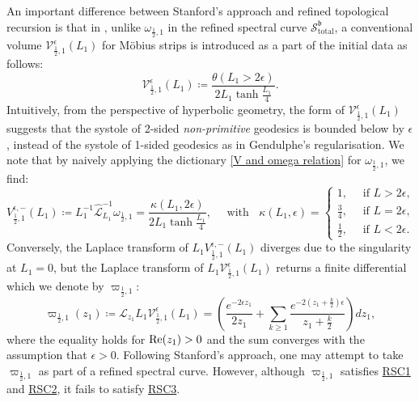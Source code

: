 \documentclass[12pt]{amsart}
\theoremstyle{plain}
\theoremstyle{definition}
\theoremstyle{remark}
\numberwithin{equation}{section}
\begin{document}
An important difference between Stanford's approach and refined topological recursion is that in \cite{Sta23}, unlike $\omega_{\frac12,1}$ in the refined spectral curve $\mathcal{S}^\mathfrak{b}_{\text{total}}$, a conventional volume $\mathcal{V}_{\frac12,1}^{\epsilon}(L_1)$ for M\"{o}bius strips is introduced as a part of the initial data as follows:
\[\mathcal{V}_{\frac12,1}^{\epsilon}(L_1)\coloneqq\frac{\theta(L_1>2\epsilon)}{2L_1\tanh\frac{L_1}{4}}.\]
Intuitively, from the perspective of hyperbolic geometry, the form of $\mathcal{V}_{\frac12,1}^{\epsilon}(L_1)$ suggests that the systole of 2-sided \emph{non-primitive} geodesics is bounded below by $\epsilon$, instead of the systole of 1-sided geodesics as in Gendulphe's regularisation. We note that by naively applying the dictionary \eqref{V and omega relation} for $\omega_{\frac12,1}$, we find:
\[V^{\epsilon,-}_{\frac12,1}(L_1)\coloneqq L_1^{-1}\hat{\mathcal{L}}_{L_1}^{-1}\omega_{\frac12,1}=\frac{\kappa(L_1,2\epsilon)}{2L_1\tanh\frac{L_1}{4}},\quad \text{ with }\;\; \kappa(L_1,\epsilon)=\begin{cases}
	1,\quad \text{ if } L>2\epsilon,\\
	\frac34,\quad \text{ if } L=2\epsilon,\\
	\frac12, \quad \text{ if } L<2\epsilon.
\end{cases}\]
Conversely, the Laplace transform of $L_1{V}_{\frac12,1}^{\epsilon,-}(L_1)$ diverges due to the singularity at $L_1=0$, but the Laplace transform of $L_1\mathcal{V}_{\frac12,1}^\epsilon(L_1)$ returns a finite differential which we denote by $\varpi_{\frac12,1}$:
\[\varpi_{\frac12,1}(z_1)\coloneqq\mathcal{L}_{z_1}L_1\mathcal{V}_{\frac12,1}^\epsilon(L_1)
=\left(\frac{e^{-2\epsilon z_1}}{2z_1}+\sum_{k\geq1}\frac{e^{-2(z_1+\frac{k}{2})\epsilon}}{z_1+\frac{k}{2}}\right)dz_1,\]
where the equality holds for ${\rm Re}(z_1)>0$ and the sum converges with the assumption that $\epsilon>0$. Following Stanford's approach, one may attempt to take $\varpi_{\frac12,1}$ as part of a refined spectral curve. However, although $\varpi_{\frac12,1}$  satisfies \hyperref[item:RSC1]{RSC1} and \hyperref[item:RSC2]{RSC2}, it fails to satisfy \hyperref[item:RSC3]{RSC3}.



\end{document}
